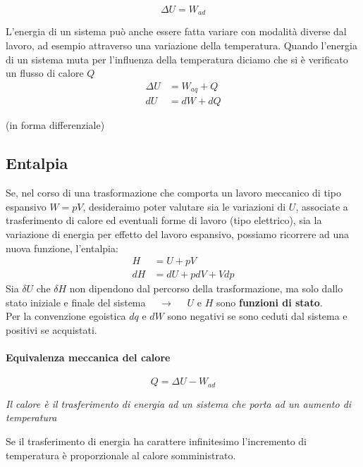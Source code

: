 \documentclass{article}
\newcommand{\so}{\quad \rightarrow \quad}
\newcommand{\ce}[1]{\begin{center}\textit{#1}\end{center}}
\begin{document}
\begin{equation*}
    \Delta U=W_{ad}
\end{equation*}

L'energia di un sistema può anche essere fatta variare con modalità diverse dal lavoro, ad esempio attraverso una variazione della temperatura. Quando l'energia di un sistema muta per l'influenza della temperatura diciamo che si è verificato un flusso di calore $Q$
\begin{align*}
    \Delta U&=W_{aq}+Q\\
    dU&=dW+dQ
\end{align*}
\begin{center}
    (in forma differenziale)
\end{center}

\subsection{Entalpia}
Se, nel corso di una trasformazione che comporta un lavoro meccanico di tipo espansivo $W=pV$, desideraimo poter valutare sia le variazioni di $U$, associate a trasferimento di calore ed eventuali forme di lavoro (tipo elettrico), sia la variazione di energia per effetto del lavoro espansivo, possiamo ricorrere ad una nuova funzione, l'entalpia:
\begin{align*}
    H&=U+pV\\
    dH&=dU+pdV+Vdp
\end{align*}
 Sia $\delta U$ che $\delta H$ non dipendono dal percorso della trasformazione, ma solo dallo stato iniziale e finale del sistema $\so$ $U$ e $H$ sono \textbf{funzioni di stato}.
 \\ Per la convenzione egoistica $dq$ e $dW$ sono negativi se sono ceduti dal sistema e positivi se acquistati.

\paragraph{Equivalenza meccanica del calore}
\begin{equation*}
    Q=\Delta U -  W_{ad}
\end{equation*}
\ce{Il calore è il trasferimento di energia ad un sistema che porta ad un aumento di temperatura} 
Se il trasferimento di energia ha carattere infinitesimo l'incremento di temperatura è proporzionale al calore somministrato.
\end{document}
